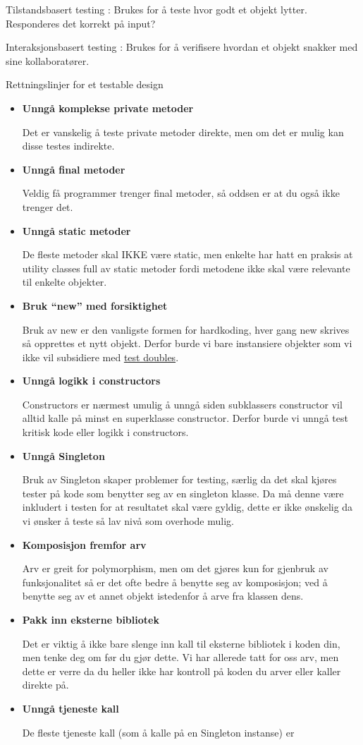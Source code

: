 Tilstandsbasert testing : Brukes for å teste hvor godt et objekt lytter.
Responderes det korrekt på input?

Interaksjonsbasert testing : Brukes for å verifisere hvordan et objekt
snakker med sine kollaboratører.

Rettningslinjer for et testable design

\begin{itemize}
\item
  \textbf{Unngå komplekse private metoder}

  Det er vanskelig å teste private metoder direkte, men om det er mulig
  kan disse testes indirekte.
\item
  \textbf{Unngå final metoder}

  Veldig få programmer trenger final metoder, så oddsen er at du også
  ikke trenger det.
\item
  \textbf{Unngå static metoder}

  De fleste metoder skal IKKE være static, men enkelte har hatt en
  praksis at utility classes full av static metoder fordi metodene ikke
  skal være relevante til enkelte objekter.
\item
  \textbf{Bruk ``new'' med forsiktighet}

  Bruk av new er den vanligste formen for hardkoding, hver gang new
  skrives så opprettes et nytt objekt. Derfor burde vi bare instansiere
  objekter som vi ikke vil subsidiere med
  \href{\#Essensielle-TDD-konsepter}{test doubles}.
\item
  \textbf{Unngå logikk i constructors}

  Constructors er nærmest umulig å unngå siden subklassers constructor
  vil alltid kalle på minst en superklasse constructor. Derfor burde vi
  unngå test kritisk kode eller logikk i constructors.
\item
  \textbf{Unngå Singleton}

  Bruk av Singleton skaper problemer for testing, særlig da det skal
  kjøres tester på kode som benytter seg av en singleton klasse. Da må
  denne være inkludert i testen for at resultatet skal være gyldig,
  dette er ikke ønskelig da vi ønsker å teste så lav nivå som overhode
  mulig.
\item
  \textbf{Komposisjon fremfor arv}

  Arv er greit for polymorphism, men om det gjøres kun for gjenbruk av
  funksjonalitet så er det ofte bedre å benytte seg av komposisjon; ved
  å benytte seg av et annet objekt istedenfor å arve fra klassen dens.
\item
  \textbf{Pakk inn eksterne bibliotek}

  Det er viktig å ikke bare slenge inn kall til eksterne bibliotek i
  koden din, men tenke deg om før du gjør dette. Vi har allerede tatt
  for oss arv, men dette er verre da du heller ikke har kontroll på
  koden du arver eller kaller direkte på.
\item
  \textbf{Unngå tjeneste kall}

  De fleste tjeneste kall (som å kalle på en Singleton instanse) er
\end{itemize}
